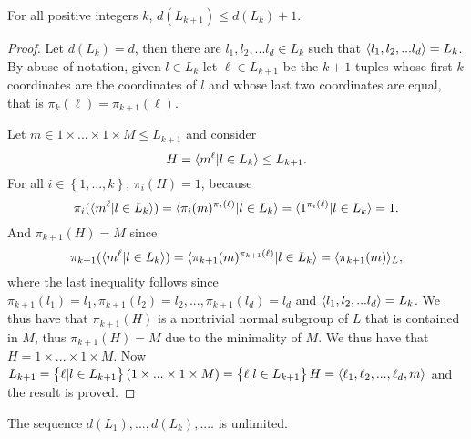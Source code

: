 \begin{theorem}
    \label{S2:bounddLk}
    For all positive integers $k$, $d(L_{k+1}) \le d(L_k) + 1$.    
\end{theorem}
\begin{proof}
    Let $d(L_k) = d$, then there are $l_1, l_2, ... l_d \in L_k$ such that $\langle l_1, l_2, ... l_d \rangle = L_k$. By abuse of notation, given $l \in L_k$ let $\ell \in L_{k+1}$ be the $k+1$-tuples whose first $k$ coordinates are the coordinates of $l$ and whose last two coordinates are equal, that is $\pi_k(\ell) = \pi_{k+1}(\ell)$. 
        
    Let $m \in 1 \times ... \times 1 \times M \le L_{k+1}$ and consider
    $$H = \langle m^\ell | l \in L_k \rangle \le L_{k+1}.$$
    For all $i \in \left\{1, ..., k \right\}$, $\pi_i(H) = 1$, because
    $$\pi_i(\langle m^\ell | l \in L_k \rangle) = \langle \pi_i(m)^{\pi_i(\ell)} | l \in L_k \rangle = \langle 1^{\pi_i(\ell)} | l \in L_k \rangle = 1.$$ 
    And $\pi_{k+1}(H) = M$ since
    $$\pi_{k+1}(\langle m^\ell | l \in L_k \rangle) = \langle \pi_{k+1}(m)^{\pi_{k+1}(\ell)} | l \in L_k \rangle = \langle \pi_{k+1}(m) \rangle_L,$$
    where the last inequality follows since $\pi_{k+1}(l_1) = l_1, \pi_{k+1}(l_2) = l_2, ..., \pi_{k+1}(l_d) = l_d$ and $\langle l_1, l_2, ... l_d \rangle = L_k$. We thus have that $\pi_{k+1}(H)$ is a nontrivial normal subgroup of $L$ that is contained in $M$, thus $\pi_{k+1}(H) = M$ due to the minimality of $M$. We thus have that $H = 1 \times ... \times 1 \times M$.
    Now $L_{k+1} = \left\{ \ell | l \in L_{k+1} \right\}(1 \times ... \times 1 \times M) = \left\{ \ell | l \in L_{k+1} \right\} H = \langle \ell_1, \ell_2, ... , \ell_d, m \rangle$
    and the result is proved.
    
\end{proof}

\begin{theorem}
    \label{S2:undLk}
    The sequence $d(L_1),...,d(L_k), ....$ is unlimited.
\end{theorem}

